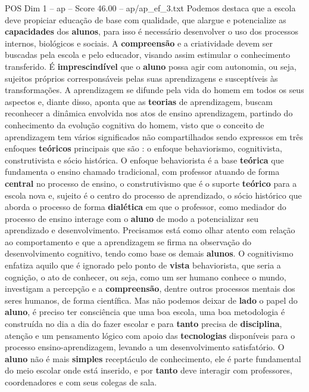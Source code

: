 \begin{textsample}{POS Dim 1 – ap – Score 46.00 – ap/ap\_ef\_3.txt}
Podemos destaca que a escola deve propiciar educação de base com qualidade, que alargue e potencialize as \textbf{capacidades} dos \textbf{alunos}, para isso é necessário desenvolver o uso dos processos internos, biológicos e sociais.
A \textbf{compreensão} e a criatividade devem ser buscadas pela escola e pelo educador, visando assim estimular o conhecimento transferido.
É \textbf{imprescindível} que o \textbf{aluno} possa agir com autonomia, ou seja, sujeitos próprios corresponsáveis pelas suas aprendizagens e susceptíveis às transformações.
A aprendizagem se difunde pela vida do homem em todos os seus aspectos e, diante disso, aponta que as \textbf{teorias} de aprendizagem, buscam reconhecer a dinâmica envolvida nos atos de ensino aprendizagem, partindo do conhecimento da evolução cognitiva do homem, visto que o conceito de aprendizagem tem vários significados não compartilhados sendo expressos em três enfoques \textbf{teóricos} principais que são : o enfoque behaviorismo, cognitivista, construtivista e sócio histórica.
O enfoque behaviorista é a base \textbf{teórica} que fundamenta o ensino chamado tradicional, com professor atuando de forma \textbf{central} no processo de ensino, o construtivismo que é o suporte \textbf{teórico} para a escola nova e, sujeito é o centro do processo de aprendizado, o sócio histórico que aborda o processo de forma \textbf{dialética} em que o professor, como mediador do processo de ensino interage com o \textbf{aluno} de modo a potencializar seu aprendizado e desenvolvimento.
Precisamos está como olhar atento com relação ao comportamento e que a aprendizagem se firma na observação do desenvolvimento cognitivo, tendo como base os demais \textbf{alunos}.
O cognitivismo enfatiza aquilo que é ignorado pelo ponto de \textbf{vista} behaviorista, que seria a cognição, o ato de conhecer, ou seja, como um ser humano conhece o mundo, investigam a percepção e a \textbf{compreensão}, dentre outros processos mentais dos seres humanos, de forma científica.
Mas não podemos deixar de \textbf{lado} o papel do \textbf{aluno}, é preciso ter consciência que uma boa escola, uma boa metodologia é construída no dia a dia do fazer escolar e para \textbf{tanto} precisa de \textbf{disciplina}, atenção e um pensamento lógico com apoio das \textbf{tecnologias} disponíveis para o processo ensino-aprendizagem, levando a um desenvolvimento satisfatório.
O \textbf{aluno} não é mais \textbf{simples} receptáculo de conhecimento, ele é parte fundamental do meio escolar onde está inserido, e por \textbf{tanto} deve interagir com professores, coordenadores e com seus colegas de sala.

\end{textsample}

